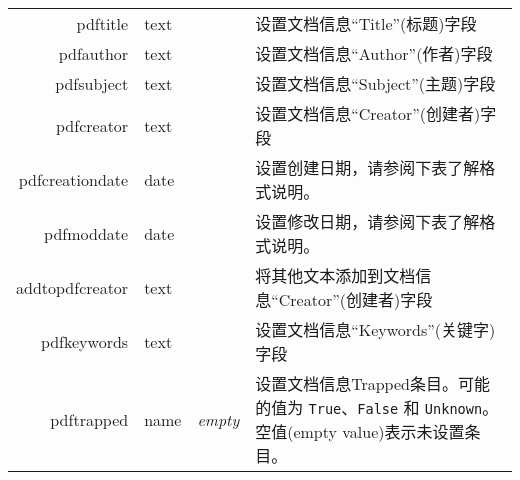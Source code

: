 \documentclass{article}
\begin{document}
\begin{longtable}{@{}>{\ttfamily}r>{\raggedright}p{}>{\itshape}lp{7cm}@{}}
  pdftitle            & text           &                           & 设置文档信息“Title”(标题)字段                                                                                                                                                                                                          \\
  pdfauthor           & text           &                           & 设置文档信息“Author”(作者)字段                                                                                                                                                                                                         \\
  pdfsubject          & text           &                           & 设置文档信息“Subject”(主题)字段                                                                                                                                                                                                        \\
  pdfcreator          & text           &                           & 设置文档信息“Creator”(创建者)字段                                                                                                                                                                                                       \\
  pdfcreationdate     & date           &                           & 设置创建日期，请参阅下表了解格式说明。\\
  pdfmoddate          & date           &                           & 设置修改日期，请参阅下表了解格式说明。\\
  addtopdfcreator     & text           &                           & 将其他文本添加到文档信息“Creator”(创建者)字段                                                                                                                                                                                                 \\
  pdfkeywords         & text           &                           & 设置文档信息“Keywords”(关键字)字段                                                                                                                                                                                                      \\
  pdftrapped          & name           & empty                     & 设置文档信息Trapped条目。可能的值为 \verb|True|、\verb|False| 和 \verb|Unknown|。空值(empty value)表示未设置条目。                                                                                                                                      \\

\end{longtable}
\end{document}
